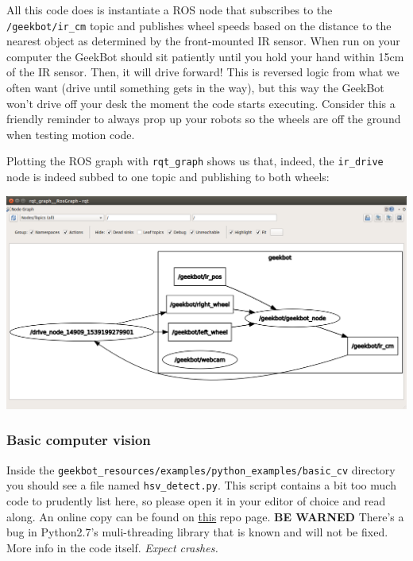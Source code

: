 All this code does is instantiate a ROS node that subscribes to the
\texttt{/geekbot/ir\_cm} topic and publishes wheel speeds based on the
distance to the nearest object as determined by the front-mounted IR
sensor. When run on your computer the GeekBot should sit patiently until
you hold your hand within 15cm of the IR sensor. Then, it will drive
forward! This is reversed logic from what we often want (drive until
something gets in the way), but this way the GeekBot won't drive off
your desk the moment the code starts executing. Consider this a friendly
reminder to always prop up your robots so the wheels are off the ground
when testing motion code.

Plotting the ROS graph with \texttt{rqt\_graph} shows us that, indeed,
the \texttt{ir\_drive} node is indeed subbed to one topic and publishing
to both wheels:

\includegraphics{figures/geekbot/repo_usage/drive_node.png}

\hypertarget{basic-computer-vision}{%
\subsubsection{Basic computer vision}\label{basic-computer-vision}}

Inside the
\texttt{geekbot\_resources/examples/python\_examples/basic\_cv}
directory you should see a file named \texttt{hsv\_detect.py}. This
script contains a bit too much code to prudently list here, so please
open it in your editor of choice and read along. An online copy can be
found on
\href{https://github.com/sdsmt-robotics/geekbot_resources/blob/master/examples/python_examples/basic_cv/hsv_detect.py}{this}
repo page. \textbf{BE WARNED} There's a bug in Python2.7's
muli-threading library that is known and will not be fixed. More info in
the code itself. \emph{Expect crashes.}

